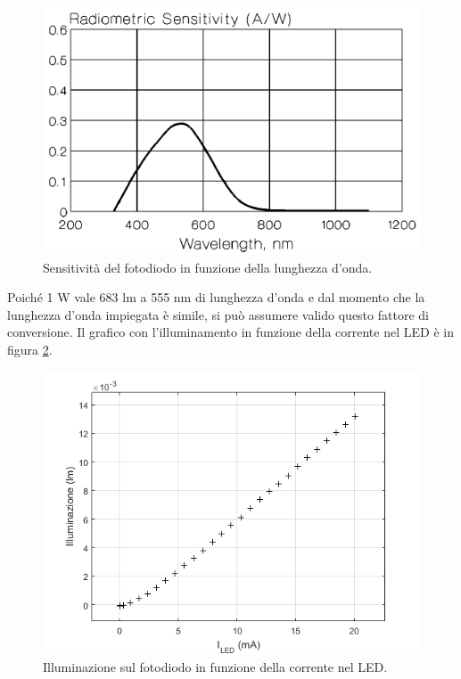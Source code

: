 \documentclass[journal, a4paper]{IEEEtran}
\begin{document}
\begin{figure}[htp]
\centering
\includegraphics[scale=.5]{sensitivity}
\caption{Sensitività del fotodiodo in funzione della lunghezza d'onda.}
\label{fig:sens}
\end{figure}

Poiché 1 W vale 683 lm a 555 nm di lunghezza d'onda e dal momento che la lunghezza d'onda impiegata è simile, si può assumere valido questo fattore di conversione. Il grafico con l'illuminamento in funzione della corrente nel LED è in figura \ref{fig:illum_cor}.

\begin{figure}[htp]
\centering
\includegraphics[scale=.5]{illum_cur}
\caption{Illuminazione sul fotodiodo in funzione della corrente nel LED.}
\label{fig:illum_cor}
\end{figure}
\end{document}
